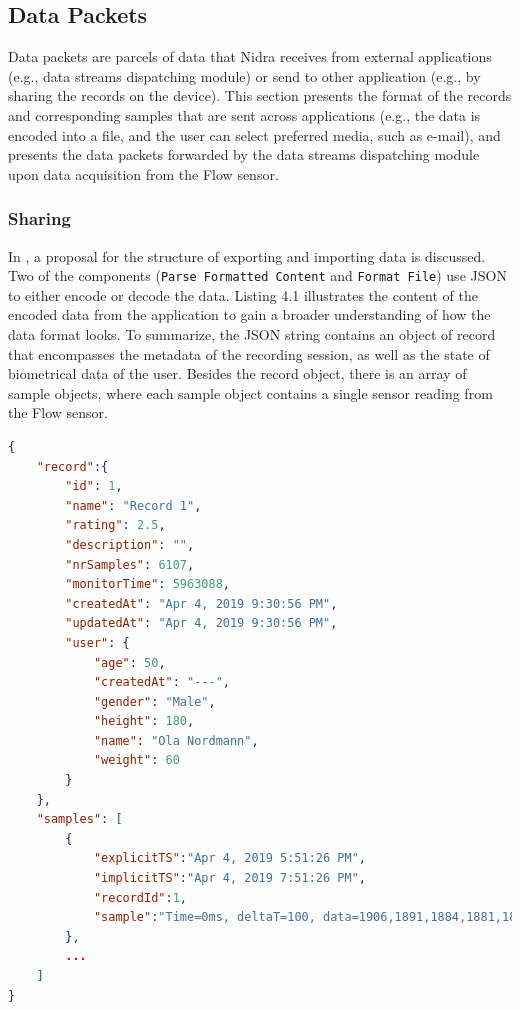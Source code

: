 \subsection{Data Packets}\label{design:datapackets}
Data packets are parcels of data that Nidra receives from external applications (e.g., data streams dispatching module) or send to other application (e.g., by sharing the records on the device). This section presents the format of the records and corresponding samples that are sent across applications (e.g., the data is encoded into a file, and the user can select preferred media, such as e-mail), and presents the data packets forwarded by the data streams dispatching module upon data acquisition from the Flow sensor.

\subsubsection{Sharing}

In , a proposal for the structure of exporting and importing data is discussed. Two of the components (\verb|Parse Formatted Content| and \verb|Format File|) use JSON to either encode or decode the data. Listing 4.1 illustrates the content of the encoded data from the application to gain a broader understanding of how the data format looks. To summarize, the JSON string contains an object of record that encompasses the metadata of the recording session, as well as the state of biometrical data of the user. Besides the record object, there is an array of sample objects, where each sample object contains a single sensor reading from the Flow sensor. 

\begin{lstlisting}[language=json, caption={A JSON string object that contains the record which has metadata from the recording session (including the biometrical data of the user), and a list of samples (where each samples contains a single sensor reading).}, captionpos=b]
{
    "record":{  
        "id": 1,
        "name": "Record 1",
        "rating": 2.5,
        "description": "",
        "nrSamples": 6107,
        "monitorTime": 5963088,
        "createdAt": "Apr 4, 2019 9:30:56 PM",
        "updatedAt": "Apr 4, 2019 9:30:56 PM",
        "user": {  
            "age": 50,
            "createdAt": "---",
            "gender": "Male",
            "height": 180,
            "name": "Ola Nordmann",
            "weight": 60
        }
    },
    "samples": [  
        {  
            "explicitTS":"Apr 4, 2019 5:51:26 PM",
            "implicitTS":"Apr 4, 2019 7:51:26 PM",
            "recordId":1,
            "sample":"Time=0ms, deltaT=100, data=1906,1891,1884,1881,1876,1718,1690"
        },
        ...
    ]
}
\end{lstlisting}

